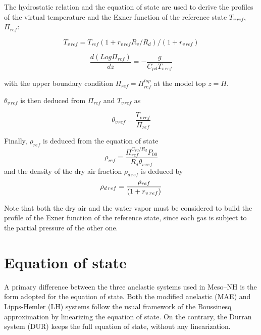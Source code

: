The hydrostatic relation and the equation of state are used to derive the
profiles of the virtual temperature and the Exner function of the reference
state $T_{v\,ref}$, $\Pi_{ref}$:

\begin{equation}
T_{v\,ref}=T_{ref}(1+r_{v\,ref} R_v/R_d)/(1+r_{v\,ref} )
\end{equation}

\begin{equation}
\dfrac{d(Log\Pi_{ref})}{dz} = -\dfrac {g}{C_{pd}T_{v\,ref}}
\end{equation}

with the upper boundary condition $\Pi_{ref} = \Pi_{ref}^{top}$
at the model top $z=H$.

\vspace{0.2cm}

$\theta_{v\,ref}$ is then deduced from $\Pi_{ref} $  and
$T_{v\,ref}$  as

\begin{equation}
\theta_{v\,ref} = \dfrac{T_{v\,ref}}{\Pi_{ref}}
\end{equation}

\vspace{0.2cm}

Finally, $\rho_{ref}$ is deduced from the equation of state
\begin{equation}
\rho_{ref} =
\dfrac{\Pi_{ref}^{C_{vd}/R_d}P_{00} }{R_d \theta_{v\,ref}} \label{state}
\end{equation}
and the density of the dry air fraction $\rho_{d\,ref}$ is deduced by
\begin{equation}
\rho_{d\,ref}={ \rho_{ref} \over (1+r_{v\,ref}) }
\end{equation}

Note that both the dry air and the water vapor must be considered to build the
profile of the Exner function of the reference state, since each gas
is subject to the partial pressure of the other one.

\section{Equation of state}

A primary difference between the three anelastic systems used in Meso--NH is the form
adopted for the equation of state.
Both the modified anelastic (MAE) and Lipps-Hemler (LH) systems follow
the usual framework of the Boussinesq approximation by linearizing the equation of state. On
the contrary, the Durran system (DUR) keeps the full equation of state, without any
linearization.


